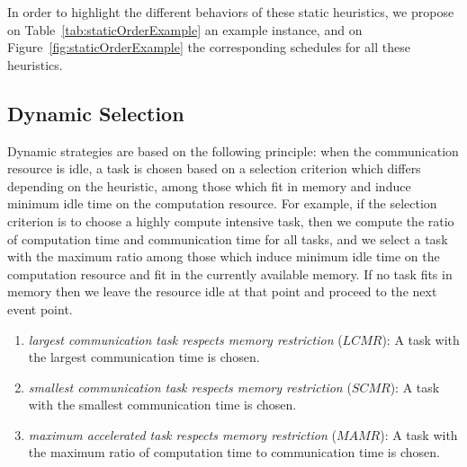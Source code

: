 \documentclass[sigconf]{acmart}
\begin{document}
	
	
	
	In order to highlight the different behaviors of these static heuristics, we propose on Table~\ref{tab:staticOrderExample} an example instance, and on Figure~\ref{fig:staticOrderExample} the corresponding schedules for all these heuristics.
	
	
	
	
	\subsection{Dynamic Selection}
	Dynamic strategies are based on the following principle: when the communication resource is idle, a task is chosen based on a selection criterion which differs depending on the heuristic, among those which fit in memory and induce minimum idle time on the computation resource.  For example, if the selection criterion is to choose a highly compute intensive task, then we compute the ratio of computation time and communication time for all tasks, and we select a task with the maximum ratio among those which induce minimum idle time on the computation resource and fit in the currently available memory. If no task fits in memory then we leave the resource idle at that point and proceed to the next event point. 
	
	
	
	
	\begin{enumerate}[label=\roman*)]
		\item \textit{largest communication task respects memory restriction} ($LCMR$): A task with the largest communication time is chosen. 
		\item \textit{smallest communication task respects memory restriction} ($SCMR$): A task with the smallest communication time is chosen.
		\item \textit{maximum accelerated task respects memory restriction} ($MAMR$): A task with the maximum ratio of computation time to communication time is chosen.
	\end{enumerate}
\end{document}
